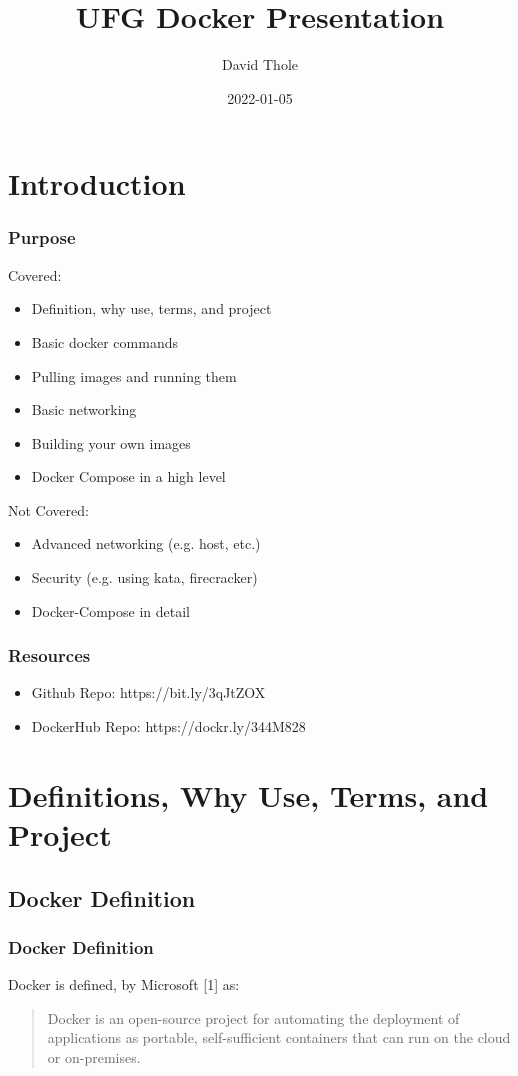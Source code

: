 \documentclass{beamer}
\begin{document}
\title{UFG Docker Presentation}
\author{David Thole}
\date{2022-01-05} 
\begin{frame}
  \titlepage
\end{frame}

\section{Introduction}
\begin{frame}\frametitle{Purpose}
  Covered:
  \begin{itemize}
    \item Definition, why use, terms, and project
    \item Basic docker commands
    \item Pulling images and running them
    \item Basic networking
    \item Building your own images
    \item Docker Compose in a high level
  \end{itemize}
  Not Covered:
  \begin{itemize}
    \item Advanced networking (e.g. host, etc.)
    \item Security (e.g. using kata, firecracker)
    \item Docker-Compose in detail
  \end{itemize}
\end{frame}
\begin{frame}\frametitle{Resources}
  \begin{itemize}
    \item Github Repo: https://bit.ly/3qJtZOX
    \item DockerHub Repo: https://dockr.ly/344M828
  \end{itemize}
\end{frame}

\section{Definitions, Why Use, Terms, and Project}
\subsection{Docker Definition}
\begin{frame}\frametitle{Docker Definition}
  Docker is defined, by Microsoft \small{[1]} as:
  \begin{quote}
    Docker is an open-source project for automating the deployment of applications as portable, self-sufficient containers that can run on the cloud or on-premises.
  \end{quote}
\end{frame}
\end{document}
